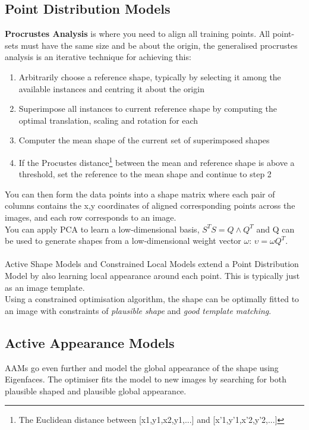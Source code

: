 \documentclass{article}
\begin{document}
	\subsection{Point Distribution Models}
	\textbf{Procrustes Analysis} is where you need to align all training points. All point-sets must have the same size and be about the origin, the generalised procrustes analysis is an iterative technique for achieving this:
	\begin{enumerate}
		\item Arbitrarily choose a reference shape, typically by selecting it among the available instances and centring it about the origin
		\item Superimpose all instances to current reference shape by computing the optimal translation, scaling and rotation for each
		\item Computer the mean shape of the current set of superimposed shapes
		\item If the Procustes distance\footnote{The Euclidean distance between [x1,y1,x2,y1,...] and [x'1,y'1,x'2,y'2,...]} between the mean and reference shape is above a threshold, set the reference to the mean shape and continue to step 2
	\end{enumerate}
	You can then form the data points into a shape matrix where each pair of columns contains the x,y coordinates of aligned corresponding points across the images, and each row corresponds to an image.\\
	You can apply PCA to learn a low-dimensional basis, $S^TS=Q\land Q^T$ and Q can be used to generate shapes from a low-dimensional weight vector $\omega$: $\upsilon=\omega Q^T$.\\
	\\
	Active Shape Models and Constrained Local Models extend a Point Distribution Model by also learning local appearance around each point. This is typically just as an image template.\\
	Using a constrained optimisation algorithm, the shape can be optimally fitted to an image with constraints of \textit{plausible shape} and \textit{good template matching}.\\
	\subsection{Active Appearance Models}
	AAMs go even further and model the global appearance of the shape using Eigenfaces. The optimiser fits the model to new images by searching for both plausible shaped and plausible global appearance.
\end{document}
